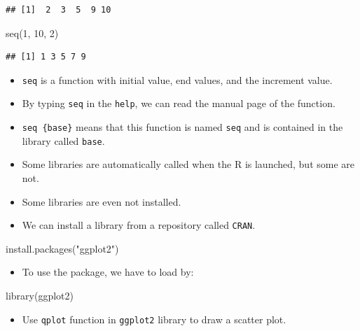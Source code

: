 \documentclass[
]{book}
\newenvironment{Shaded}{\begin{snugshade}}{\end{snugshade}}
\newcommand{\DecValTok}[1]{\textcolor[rgb]{0.00,0.00,0.81}{#1}}
\newcommand{\FunctionTok}[1]{\textcolor[rgb]{0.00,0.00,0.00}{#1}}
\newcommand{\NormalTok}[1]{#1}
\newcommand{\StringTok}[1]{\textcolor[rgb]{0.31,0.60,0.02}{#1}}
\providecommand{\tightlist}{%
  \setlength{\itemsep}{0pt}\setlength{\parskip}{0pt}}
\begin{document}
\begin{verbatim}
## [1]  2  3  5  9 10
\end{verbatim}

\begin{Shaded}
\begin{Highlighting}[]
\FunctionTok{seq}\NormalTok{(}\DecValTok{1}\NormalTok{, }\DecValTok{10}\NormalTok{, }\DecValTok{2}\NormalTok{)}
\end{Highlighting}
\end{Shaded}

\begin{verbatim}
## [1] 1 3 5 7 9
\end{verbatim}

\begin{itemize}
\tightlist
\item
  \texttt{seq} is a function with initial value, end values, and the increment value.
\item
  By typing \texttt{seq} in the \texttt{help}, we can read the manual page of the function.
\item
  \texttt{seq\ \{base\}} means that this function is named \texttt{seq} and is contained in the library called \texttt{base}.
\item
  Some libraries are automatically called when the R is launched, but some are not.
\item
  Some libraries are even not installed.
\item
  We can install a library from a repository called \texttt{CRAN}.
\end{itemize}

\begin{Shaded}
\begin{Highlighting}[]
\FunctionTok{install.packages}\NormalTok{(}\StringTok{"ggplot2"}\NormalTok{)}
\end{Highlighting}
\end{Shaded}

\begin{itemize}
\tightlist
\item
  To use the package, we have to load by:
\end{itemize}

\begin{Shaded}
\begin{Highlighting}[]
\FunctionTok{library}\NormalTok{(ggplot2)}
\end{Highlighting}
\end{Shaded}

\begin{itemize}
\tightlist
\item
  Use \texttt{qplot} function in \texttt{ggplot2} library to draw a scatter plot.
\end{itemize}
\end{document}
